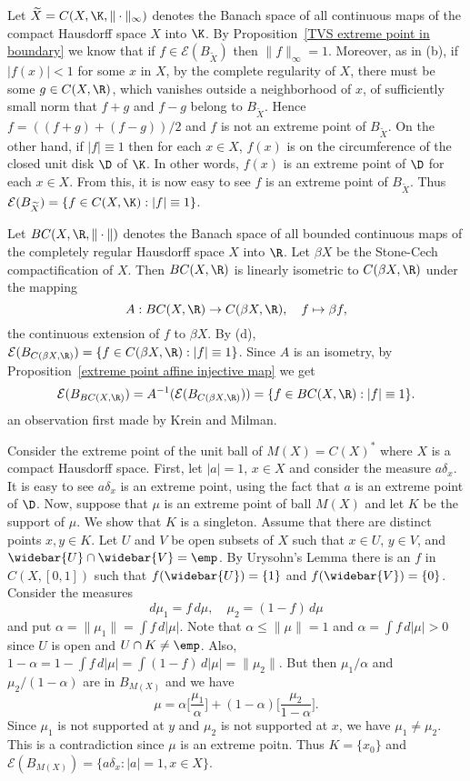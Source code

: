 \begin{example}\label{extreme point of C(X)}
Let $\widetilde{X}=C(X,\K,\|\cdot\|_\infty)$ denotes the Banach space of all continuous maps of the compact Hausdorff space $X$ into $\K$. By Proposition~\ref{TVS extreme point in boundary} we know that if $f\in\mathcal{E}(B_{\widetilde{X}})$ then $\|f\|_\infty=1$. Moreover, as in (b), if $|f(x)|<1$ for some $x$ in $X$, by the complete regularity of $X$, there must be some $g\in C(X,\R)$, which vanishes outside a neighborhood of $x$, of sufficiently small norm that $f+g$ and $f-g$ belong to $B_{\widetilde{X}}$. Hence $f=((f+g)+(f-g))/2$ and $f$ is not an extreme point of $B_{\widetilde{X}}$. On the other hand, if $|f|\equiv 1$ then for each $x\in X$, $f(x)$ is on the circumference of the closed unit disk $\D$ of $\K$. In other words, $f(x)$ is an extreme point of $\D$ for each $x\in X$. From this, it is now easy to see $f$ is an extreme point of $B_{\widetilde{X}}$. Thus $\mathcal{E}(B_{\widetilde{X}})=\{f\in C(X,\K):|f|\equiv 1\}$.\par
Let $BC(X,\R,\|\cdot\|)$ denotes the Banach space of all bounded continuous maps of the completely regular Hausdorff space $X$ into $\R$. Let $\beta X$ be the Stone-Cech compactification of $X$. Then $BC(X,\R)$ is linearly isometric to $C(\beta X,\R)$ under the mapping 
\[A:BC(X,\R)\to C(\beta X,\R),\quad f\mapsto \beta f,\]
the continuous extension of $f$ to $\beta X$. By (d), $\mathcal{E}(B_{C(\beta X,\R)})=\{f\in C(\beta X,\R):|f|\equiv 1\}$. Since $A$ is an isometry, by Proposition~\ref{extreme point affine injective map} we get
\[\mathcal{E}(B_{BC(X,\R)})=A^{-1}(\mathcal{E}(B_{C(\beta X,\R)}))=\{f\in BC(X,\R):|f|\equiv 1\}.\]
an observation first made by Krein and Milman.
\end{example}
\begin{example}
Consider the extreme point of the unit ball of $M(X)=C(X)^*$ where $X$ is a compact Hausdorff space. First, let $|a|=1$, $x\in X$ and consider the measure $a\delta_x$. It is easy to see $a\delta_x$ is an extreme point, using the fact that $a$ is an extreme point of $\D$. Now, suppose that $\mu$ is an extreme point of ball $M(X)$ and let $K$ be the support of $\mu$. We show that $K$ is a singleton. Assume that there are distinct points $x,y\in K$. Let $U$ and $V$ be open subsets of $X$ such that $x\in U$, $y\in V$, and $\widebar{U}\cap\widebar{V}=\emp$. By Urysohn's Lemma there is an $f$ in $C(X,[0,1])$ such that $f(\widebar{U})=\{1\}$ and $f(\widebar{V})=\{0\}$. Consider the measures 
\[d\mu_1=f\,d\mu,\quad \mu_2=(1-f)\,d\mu\]
and put $\alpha=\|\mu_1\|=\int f\,d|\mu|$. Note that $\alpha\leq\|\mu\|=1$ and $\alpha=\int f\,d|\mu|>0$ since $U$ is open and $U\cap K\neq\emp$. Also, $1-\alpha=1-\int f\,d|\mu|=\int(1-f)\,d|\mu|=\|\mu_2\|$. But then $\mu_1/\alpha$ and $\mu_2/(1-\alpha)$ are in $B_{M(X)}$ and we have
\[\mu=\alpha\Big[\frac{\mu_1}{\alpha}\Big]+(1-\alpha)\Big[\frac{\mu_2}{1-\alpha}\Big].\]
Since $\mu_1$ is not supported at $y$ and $\mu_2$ is not supported at $x$, we have $\mu_1\neq\mu_2$. This is a contradiction since $\mu$ is an extreme poitn. Thus $K=\{x_0\}$ and $\mathcal{E}(B_{M(X)})=\{a\delta_x:|a|=1,x\in X\}$.
\end{example}
